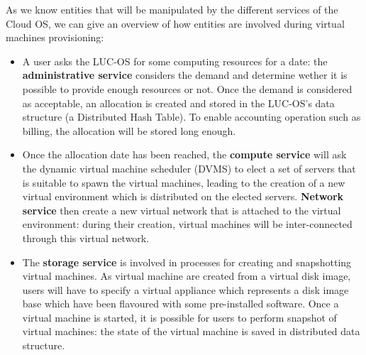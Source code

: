 As we know entities that will be manipulated by the different services of the
Cloud OS, we can give an overview of how entities are involved during virtual
machines provisioning:

\begin{itemize}

	\item A user asks the LUC-OS for some computing resources for a date: 
	the \textbf{administrative service} considers the demand and determine 
	wether it is possible to provide enough resources or not. Once the demand is
	considered as acceptable, an allocation is created and stored in the 
	LUC-OS's data structure (a Distributed Hash Table). To enable accounting 
	operation such as billing, the allocation will be stored long enough.

	\item Once the allocation date has been reached, the \textbf{compute
	service} will ask the dynamic virtual machine scheduler (DVMS) to elect a 
	set of servers that is suitable to spawn the virtual machines, leading to 
	the creation of a new virtual environment which is distributed on the 
	elected servers. \textbf{Network service} then create a new virtual	network
	that is attached to the virtual	environment: during their creation, virtual
	machines will be inter-connected through this virtual network.

	\item The \textbf{storage service} is involved in processes for creating and 
	snapshotting virtual machines. As virtual machine are created from a virtual
	disk image, users will have to specify a virtual appliance which represents
	a disk image base which have been flavoured with some pre-installed 
	software. Once a virtual machine is started, it is possible for users to
	perform snapshot of virtual machines: the state of the virtual machine is
	saved in distributed data structure.

\end{itemize}







